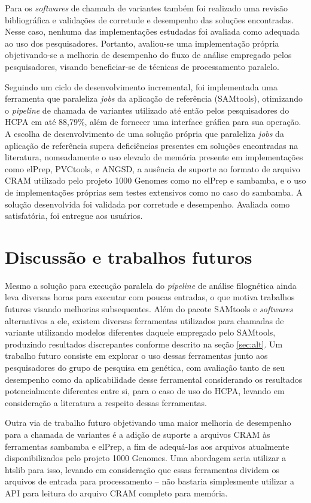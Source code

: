 \documentclass[cic,tc]{iiufrgs}
\begin{document}
Para os \textit{softwares} de chamada de variantes também foi realizado uma
revisão bibliográfica e validações de corretude e desempenho das soluções
encontradas. Nesse caso, nenhuma das implementações estudadas foi avaliada
como adequada ao uso dos pesquisadores. Portanto, avaliou-se uma implementação
própria objetivando-se a melhoria de desempenho do fluxo de análise empregado
pelos pesquisadores, visando beneficiar-se de técnicas de processamento
paralelo.

Seguindo um ciclo de desenvolvimento incremental, foi implementada uma
ferramenta que paraleliza \textit{jobs} da aplicação de referência (SAMtools),
otimizando o \textit{pipeline} de chamada de variantes utilizado até então
pelos pesquisadores do HCPA em até 88,79\%, além de fornecer uma interface
gráfica para sua operação. A escolha de desenvolvimento de uma solução própria
que paraleliza \textit{jobs} da aplicação de referência supera deficiências
presentes em soluções encontradas na literatura, nomeadamente o uso elevado de
memória presente em implementações como elPrep, PVCtools, e ANGSD, a ausência
de suporte ao formato de arquivo CRAM utilizado pelo projeto 1000 Genomes como
no elPrep e sambamba, e o uso de implementações próprias sem testes extensivos
como no caso do sambamba. A solução desenvolvida foi validada por corretude e
desempenho. Avaliada como satisfatória, foi entregue aos usuários.

\section{Discussão e trabalhos futuros}

Mesmo a solução para execução paralela do \textit{pipeline} de análise
filognética ainda leva diversas horas para executar com poucas entradas, o que
motiva trabalhos futuros visando melhorias subsequentes. Além do pacote
SAMtools e \textit{softwares} alternativos a ele, existem diversas ferramentas
utilizados para chamadas de variante utilizando modelos diferentes daquele
empregado pelo SAMtools, produzindo resultados discrepantes conforme descrito
na seção \ref{sec:alt}. Um trabalho futuro consiste em explorar o uso dessas
ferramentas junto aos pesquisadores do grupo de pesquisa em genética, com
avaliação tanto de seu desempenho como da aplicabilidade desse ferramental
considerando os resultados potencialmente diferentes entre si, para o caso de
uso do HCPA, levando em consideração a literatura a respeito dessas
ferramentas.

Outra via de trabalho futuro objetivando uma maior melhoria de desempenho para
a chamada de variantes é a adição de suporte a arquivos CRAM às ferramentas
sambamba e elPrep, a fim de adequá-las aos arquivos atualmente disponibilizados
pelo projeto 1000 Genomes. Uma abordagem seria utilizar a htslib para isso,
levando em consideração que essas ferramentas dividem os arquivos de entrada
para processamento -- não bastaria simplesmente utilizar a API para leitura do
arquivo CRAM completo para memória.
\end{document}
